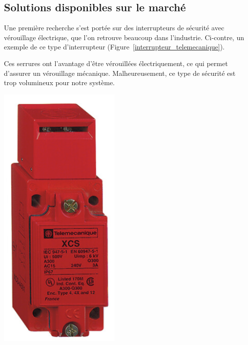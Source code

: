 \subsection{Solutions disponibles sur le marché}
\begin{minipage}[c]{0.6\textwidth}
    Une première recherche s'est portée sur des interrupteurs de sécurité avec vérouillage électrique, que l'on retrouve beaucoup dans l'industrie. Ci-contre, un exemple de ce type d'interrupteur (Figure~\ref{interrupteur_telemecanique}).

    Ces serrures ont l'avantage d'être vérouillées électriquement, ce qui permet d'assurer un vérouillage mécanique. Malheureusement, ce type de sécurité est trop volumineux pour notre système.
\end{minipage}\hfill
\begin{minipage}[c]{0.35\textwidth}
    \begin{center}
        \includegraphics[width=0.45\textwidth]{assets/figures/Protections_laser/Securite_electrique/serrure_telemecanique.png}
    \end{center}
    \label{interrupteur_telemecanique}
\end{minipage}

